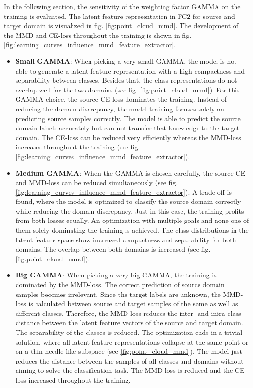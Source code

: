 In the following section, the sensitivity of the weighting factor GAMMA on the training is evaluated. The latent feature representation in FC2 for source and target domain is visualized in fig. \ref{fig:point_cloud_mmd}. The development of the MMD and CE-loss throughout the training is shown in fig. \ref{fig:learning_curves_influence_mmd_feature_extractor}.
\begin{itemize}
    \item \textbf{Small GAMMA}:
    When picking a very small GAMMA, the model is not able to generate a latent feature representation with a high compactness and separability between classes. Besides that, the class representations do not overlap well for the two domains (see fig. \ref{fig:point_cloud_mmd}). For this GAMMA choice, the source CE-loss dominates the training. Instead of reducing the domain discrepancy, the model training focuses solely on predicting source samples correctly. The model is able to predict the source domain labels accurately but can not transfer that knowledge to the target domain. The CE-loss can be reduced very efficiently whereas the MMD-loss increases throughout the training (see fig. \ref{fig:learning_curves_influence_mmd_feature_extractor}).
    \item \textbf{Medium GAMMA}:
    When the GAMMA is chosen carefully, the source CE- and MMD-loss can be reduced simultaneously (see fig. \ref{fig:learning_curves_influence_mmd_feature_extractor}). A trade-off is found, where the model is optimized to classify the source domain correctly while reducing the domain discrepancy. Just in this case, the training profits from both losses equally. An optimization with multiple goals and none one of them solely dominating the training is achieved. The class distributions in the latent feature space show increased compactness and separability for both domains. The overlap between both domains is increased (see fig. \ref{fig:point_cloud_mmd}).
    \item \textbf{Big GAMMA}:
    When picking a very big GAMMA, the training is dominated by the MMD-loss. The correct prediction of source domain samples becomes irrelevant. Since the target labels are unknown, the MMD-loss is calculated between source and target samples of the same as well as different classes. Therefore, the MMD-loss reduces the inter- and intra-class distance between the latent feature vectors of the source and target domain. The separability of the classes is reduced. The optimization ends in a trivial solution, where all latent feature representations collapse at the same point or on a thin needle-like subspace (see \ref{fig:point_cloud_mmd}). The model just reduces the distance between the samples of all classes and domains without aiming to solve the classification task. The MMD-loss is reduced and the CE-loss increased throughout the training.
\end{itemize}


